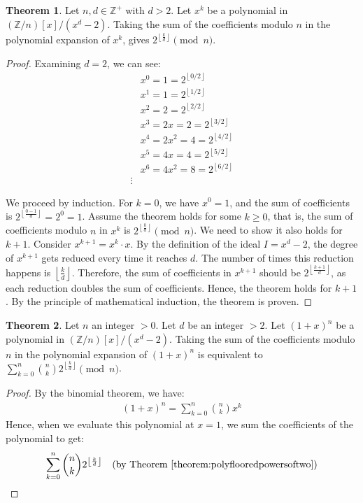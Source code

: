 \documentclass{article}
\theoremstyle{plain}
\theoremstyle{definition}
\newtheorem{theorem}{Theorem}
\newcommand{\floor}[1]{\left\lfloor #1 \right\rfloor}
\newcommand{\Z}{\mathbb{Z}}
\newcommand{\Zn}{\Z/n}
\begin{document}
\begin{theorem} \label{theorem:polyflooredpowersoftwo}
Let $n, d \in \Z^+$ with $d>2$. Let $x^k$ be a polynomial in $(\Zn)[x]/(x^d-2)$. Taking the sum of the coefficients modulo $n$ in the polynomial expansion of \( x^k \), gives $2^{\floor{\frac{k}{d}}} \pmod{n}$.
\end{theorem}
\begin{proof}
Examining $d = 2$, we can see:
\begin{align*}
& x^0 = 1 = 2^{\floor{0/2}} \\
& x^1 = 1 = 2^{\floor{1/2}} \\
& x^2 = 2 = 2^{\floor{2/2}}\\
& x^3 = 2x = 2 = 2^{\floor{3/2}}\\
& x^4 = 2x^2 = 4 = 2^{\floor{4/2}}\\
& x^5 = 4x = 4 = 2^{\floor{5/2}}\\
& x^6 = 4x^2 = 8 = 2^{\floor{6/2}}\\
\vdots
\end{align*}

We proceed by induction. For \( k = 0 \), we have \( x^0 = 1 \), and the sum of coefficients is \( 2^{\floor{\frac{0-1}{d}}} = 2^{0} = 1 \). Assume the theorem holds for some \( k \geq 0 \), that is, the sum of coefficients modulo \( n \) in \( x^k \) is \( 2^{\floor{\frac{k}{d}}} \pmod{n} \). We need to show it also holds for \( k+1 \). Consider \( x^{k+1} = x^k \cdot x \). By the definition of the ideal $I = x^d-2$, the degree of \( x^{k+1} \) gets reduced every time it reaches \( d \). The number of times this reduction happens is \( \floor{\frac{k}{d}} \). Therefore, the sum of coefficients in \( x^{k+1} \) should be \( 2^{\floor{\frac{k+1}{d}}} \), as each reduction doubles the sum of coefficients. Hence, the theorem holds for \( k+1 \). By the principle of mathematical induction, the theorem is proven.
\end{proof}

\begin{theorem} \label{theorem:polybinomialtransform}
Let $n$ an integer $>0$. Let $d$ be an integer $>2$. Let $(1 + x)^n$ be a polynomial in $(\Zn)[x]/(x^d-2)$. Taking the sum of the coefficients modulo $n$ in the polynomial expansion of $ (1 + x)^n$ is equivalent to $\sum_{k=0}^{n} \binom{n}{k} 2^{\floor{\frac{k}{d}}} \pmod{n}$.
\end{theorem}
\begin{proof}
By the binomial theorem, we have:
\begin{align}
    (1 + x)^n = \sum_{k=0}^{n} \binom{n}{k} x^{k}
\end{align}
Hence, when we evaluate this polynomial at \( x = 1 \), we sum the coefficients of the polynomial to get:
\begin{align}
    \sum_{k=0}^{n} \binom{n}{k} 2^{\floor{\frac{k}{d}}} \quad \text{(by Theorem \ref{theorem:polyflooredpowersoftwo})}
\end{align}
\end{proof}
\end{document}
